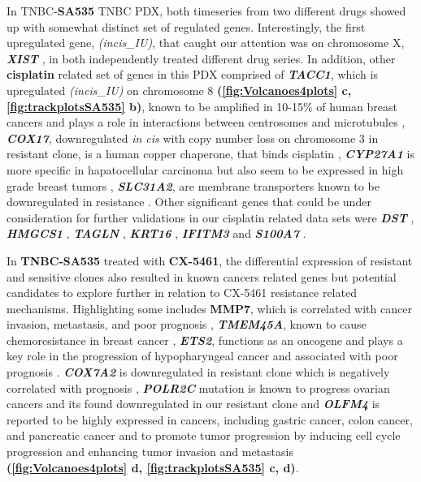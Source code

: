 In TNBC-\textbf{SA535} TNBC PDX, both timeseries from two different drugs showed up with somewhat distinct set of regulated genes. Interestingly, the first upregulated gene, \textit{(incis\_IU)}, that caught our attention was on chromosome X, \textit{\textbf{XIST}} \cite{salama2020xist,chen2017long, chen2019up}, in both independently treated different drug series. 
In addition, other \textbf{cisplatin} related set of genes in this PDX comprised of \textit{\textbf{TACC1}}, which is upregulated \textit{(incis\_IU)} on chromosome 8 \textbf{(\autoref{fig:Volcanoes4plots} c, \autoref{fig:trackplotsSA535} b)}, known to be amplified in 10-15\% of human breast cancers and plays a role in interactions between centrosomes and microtubules \cite{ray2004genomic, gergely2000tacc, shakya2018high},
 \textit{\textbf{COX17}}, downregulated \textit{in cis} with copy number loss on chromosome 3 in resistant clone, is a human copper chaperone, that binds cisplatin \cite{katano2002acquisition, zhao2014cisplatin}, \textit{\textbf{CYP27A1} }is more specific in hapatocellular carcinoma but also seem to be expressed in high grade breast tumors \cite{liang2019cyp27a1, wu201327}, \textit{\textbf{SLC31A2}}, are membrane transporters known to be downregulated in resistance \cite{bai2017structural}. Other significant genes that could be under consideration for further validations in our cisplatin related data sets were \textit{\textbf{DST} } \cite{salerno2016human,lee2012differentially}, \textit{\textbf{HMGCS1}} \cite{walsh2020mevalonate},
\textit{\textbf{TAGLN}} \cite{wu2014transgelin, elsafadi2020transgelin},
\textit{\textbf{KRT16}} \cite{huang2019novel},
\textit{\textbf{IFITM3}} \cite{liu2019ifitm3} and
\textit{\textbf{S100A7}} \cite{zhang2019clinical, mayama2018olfm}. 


In \textbf{TNBC-SA535} treated with \textbf{CX-5461}, the differential expression of resistant and sensitive clones also resulted in known cancers related genes but potential candidates to explore further in relation to CX-5461 resistance related mechanisms. %
Highlighting some  includes \textbf{MMP7}, which is correlated with cancer invasion, metastasis, and poor prognosis \cite{mcgowan2008matrix} ,
\textit{\textbf{TMEM45A}}, known to cause chemoresistance in breast cancer \cite{schmit2019characterization},
\textit{\textbf{ETS2}}, functions as an oncogene and plays a key role in the progression of hypopharyngeal cancer and associated with poor prognosis \cite{fu2017high, ge2008role}.
\textit{\textbf{COX7A2}} is downregulated in resistant clone which is negatively correlated with prognosis \cite{deng2018overexpression},
\textit{\textbf{POLR2C}} mutation is known to progress ovarian cancers and its found downregulated in our resistant clone \cite {moriwaki2017polr2c} and
\textit{\textbf{OLFM4}} is reported to be highly expressed in cancers, including gastric cancer, colon cancer, and pancreatic cancer and to promote tumor progression by inducing cell cycle progression and enhancing tumor invasion and metastasis \cite{ashizawa2019olfm4} \textbf{(\autoref{fig:Volcanoes4plots} d, \autoref{fig:trackplotsSA535} c, d)}.


